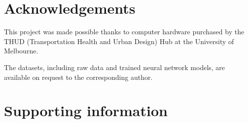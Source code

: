 \documentclass[10pt,letterpaper,hidelinks]{article}
\begin{document}


\section*{Acknowledgements}\label{sec:acknowledgements}
This project was made possible thanks to computer hardware purchased by the THUD (Transportation Health and Urban Design) Hub at the University of Melbourne.

The datasets, including raw data and trained neural network models, are available on request to the corresponding author.


\nolinenumbers

%
%
% 
\begin{thebibliography}{}

% 
% 



\end{thebibliography}


\section*{Supporting information}

\end{document}
